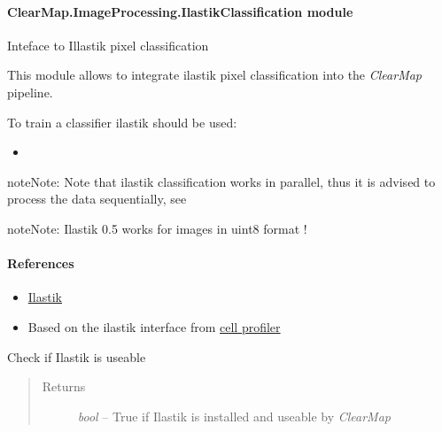 \documentclass[letterpaper,10pt,english]{sphinxmanual}
\begin{document}
\paragraph{ClearMap.ImageProcessing.IlastikClassification module}
\label{api/ClearMap.ImageProcessing:module-ClearMap.ImageProcessing.IlastikClassification}\label{api/ClearMap.ImageProcessing:clearmap-imageprocessing-ilastikclassification-module}
Inteface to Illastik pixel classification

This module allows to integrate ilastik pixel classification into the \emph{ClearMap}
pipeline.

To train a classifier ilastik should be used:
\begin{itemize}
\item {} 
\end{itemize}

\begin{notice}{note}{Note:}
Note that ilastik classification works in parallel, thus it is advised to
process the data sequentially, see
\end{notice}

\begin{notice}{note}{Note:}
Ilastik 0.5 works for images in uint8 format !
\end{notice}
\paragraph{References}
\begin{itemize}
\item {} 
\href{http://ilastik.org/}{Ilastik}

\item {} 
Based on the ilastik interface from \href{http://www.cellprofiler.org/}{cell profiler}

\end{itemize}

\begin{fulllineitems}
\label{api/ClearMap.ImageProcessing:ClearMap.ImageProcessing.IlastikClassification.isInitialized}
Check if Ilastik is useable
\begin{quote}\begin{description}
\item[{Returns}] \leavevmode
\emph{bool} --
True if Ilastik is installed and useable by \emph{ClearMap}

\end{description}\end{quote}

\end{fulllineitems}
\end{document}

